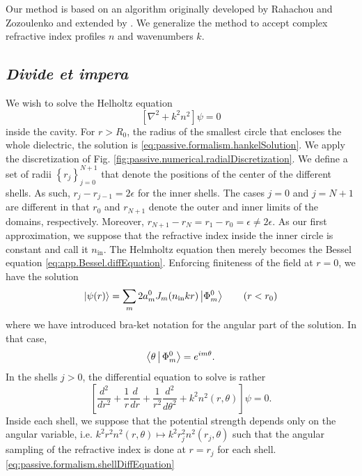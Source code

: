 Our method is based on an algorithm originally developed by 
Rahachou and Zozoulenko \cite{RAH2004} and extended by \cite{GAP2013a}. 
We generalize the method to accept complex refractive index
profiles $n$ and wavenumbers $k$. 

\subsection{\textit{Divide et impera}}
We wish to solve the Helholtz equation 
  \begin{equation}
   \left[\nabla^2+k^2n^2\right]\psi = 0
  \end{equation}
inside the cavity. For $r>R_0$, the radius of the smallest circle
that encloses the whole dielectric, the solution is 
\eqref{eq:passive.formalism.hankelSolution}. We apply the discretization
of Fig. \ref{fig:passive.numerical.radialDiscretization}. We define a set of 
radii $\left\{r_j\right\}_{j=0}^{N+1}$ that denote the positions of the center
of the different shells. As such, $r_j-r_{j-1}=2\epsilon$ for the inner shells.
The cases $j=0$ and $j=N+1$ are different in that $r_0$ and $r_{N+1}$ denote 
the outer and inner limits of the domains, respectively. Moreover, $r_{N+1}-r_N=r_1-r_0=\epsilon\neq2\epsilon$.
As our first approximation, we suppose that the refractive index
inside the inner circle is constant and call it $n_\text{in}$. The Helmholtz equation then merely
becomes the Bessel equation \eqref{eq:app.Bessel.diffEquation}. Enforcing
finiteness of the field at $r=0$, we have the solution
  \begin{equation}
   \Ket{\psi(r)} = \sum_{m}2a_m^0J_m(n_\text{in}kr)\Ket{\Phi_m^0}	\qquad (r<r_0)
  \end{equation}
where we have introduced bra-ket notation for the angular part of the 
solution. In that case, 
  \begin{equation}
   \Braket{\theta|\Phi_m^0} = e^{im\theta}.
  \end{equation}
In the shells $j>0$, the differential equation to solve is rather
  \begin{equation}
    \label{eq:passive.formalism.shellDiffEquation}
    \left[\frac{d^2}{dr^2}+\frac{1}{r}\frac{d}{dr}+\frac{1}{r^2}\frac{d^2}{d\theta^2}+k^2n^2(r,\theta)\right]\psi=0.
  \end{equation}
Inside each shell, we suppose that the potential strength depends only on the angular variable, i.e.
$k^2r^2n^2(r,\theta)\mapsto k^2r_j^2n^2(r_j,\theta)$ such that the angular sampling of the refractive
index is done at $r=r_j$ for each shell. \eqref{eq:passive.formalism.shellDiffEquation} 
